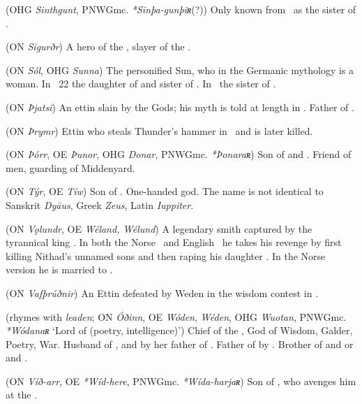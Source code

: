 \begin{itemize}
 (OHG \emph{Sinthgunt}, PNWGmc. \emph{*Sinþa-gunþiʀ}(?))
  Only known from \MerseburgTwo\ as the sister of .

 (ON \emph{Sigurðr})
  A hero of the , slayer of the  .

 (ON \emph{Sól}, OHG \emph{Sunna})
  The personified Sun, who in the Germanic mythology is a woman.  In \Vafthrudnismal\ 22 the daughter of  and sister of .  In \MerseburgTwo\ the sister of .

 (ON \emph{Þjatsi})
  An ettin slain by the Gods; his myth is told at length in \Haustlong.  Father of .

 (ON \emph{Þrymr})
  Ettin who steals Thunder’s hammer in \Thrymskvida\ and is later killed.

 (ON \emph{Þórr}, OE \emph{Þunor}, OHG \emph{Donar}, PNWGmc. \emph{*Þonaraʀ})
  Son of  and .  Friend of men, guarding of Middenyard.

 (ON \emph{Týr}, OE \emph{Tíw})
  Son of .  One-handed god.  The name is not identical to Sanskrit \emph{Dyāus}, Greek \emph{Zeus}, Latin \emph{Iuppiter}.

 (ON \emph{Vǫlundr}, OE \emph{Wéland, Wélund})
  A legendary smith captured by the tyrannical king .  In both the Norse \Volundarkvida\ and English \Deor\ he takes his revenge by first killing Nithad’s unnamed sons and then raping his daughter .  In the Norse version he is married to .

 (ON \emph{Vafþrúðnir})
  An Ettin defeated by Weden in the wisdom contest in \Vafthrudnismal.

 (rhymes with \emph{leaden}; ON \emph{Óðinn}, OE \emph{Wóden}, \emph{Wéden}, OHG \emph{Wuotan}, PNWGmc. \emph{*Wódanaʀ} ‘Lord of  (poetry, intelligence)’)
  Chief of the , God of Wisdom, Galder, Poetry, War.  Husband of , and by her father of .  Father of  by .  Brother of  and  or  and .

 (ON \emph{Víð-arr}, OE \emph{*Wíd-here}, PNWGmc. \emph{*Wída-harjaʀ})
  Son of , who avenges him at the .


\end{itemize}
